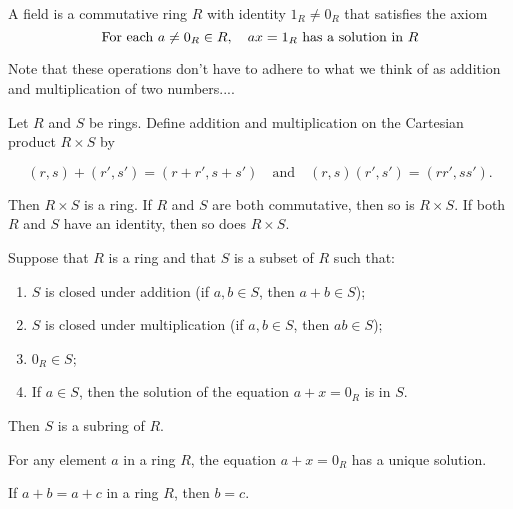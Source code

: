 \documentclass[../main.tex]{subfiles}
\begin{document}
\begin{definition}[Field]
A field is a commutative ring \(R\) with identity \(1_R \neq 0_R\) that satisfies the axiom 
\[
\textnormal{For each } a \neq 0_R \in R, \quad ax = 1_R \textnormal{ has a solution in \(R\)}
\]
\end{definition}


\begin{remark}
Note that these operations don't have to adhere to what we think of as addition and multiplication of two numbers....
\end{remark}



\begin{proposition}
Let $R$ and $S$ be rings. Define addition and multiplication on the Cartesian product $R \times S$ by

\[
(r, s) + (r', s') = (r + r', s + s') \quad \text{and} \quad (r, s)(r', s') = (rr', ss').
\]

Then $R \times S$ is a ring. If $R$ and $S$ are both commutative, then so is $R \times S$. If both $R$ and $S$ have an identity, then so does $R \times S$.
\end{proposition}





\begin{theorem}[Subring]
Suppose that $R$ is a ring and that $S$ is a subset of $R$ such that:
\begin{enumerate}
    \item $S$ is closed under addition (if $a, b \in S$, then $a + b \in S$);
    \item $S$ is closed under multiplication (if $a, b \in S$, then $ab \in S$);
    \item $0_R \in S$;
    \item If $a \in S$, then the solution of the equation $a + x = 0_R$ is in $S$.
\end{enumerate}
Then $S$ is a subring of $R$.
\end{theorem}





\begin{theorem}
For any element $a$ in a ring $R$, the equation $a + x = 0_R$ has a unique solution.
\end{theorem}





\begin{theorem}
If $a + b = a + c$ in a ring $R$, then $b = c$.
\end{theorem}
\end{document}

